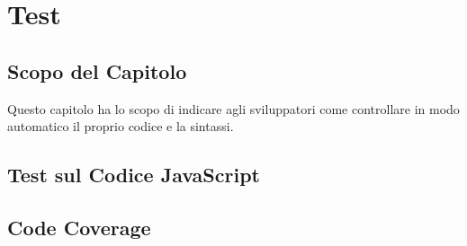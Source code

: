 \section{Test}\label{Test}

\subsection{Scopo del Capitolo}\label{Test_scopo}
Questo capitolo ha lo scopo di indicare agli sviluppatori come controllare in modo automatico il proprio codice e la sintassi.

\subsection{Test sul Codice JavaScript}

\subsection{Code Coverage}